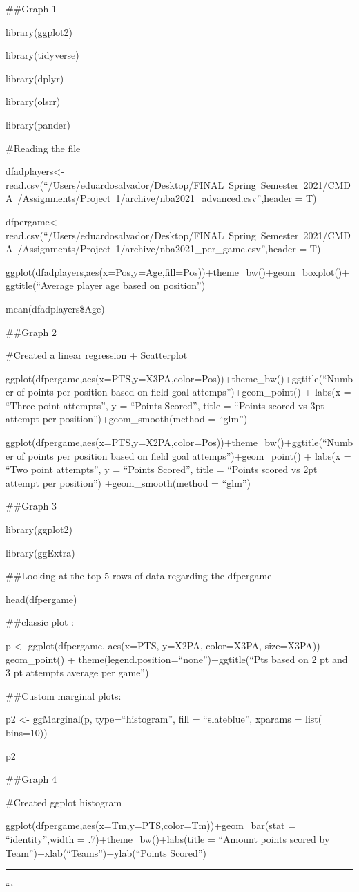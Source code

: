 \documentclass[
]{article}
\begin{document}
\#\#Graph 1

library(ggplot2)

library(tidyverse)

library(dplyr)

library(olsrr)

library(pander)

\#Reading the file

dfadplayers\textless-read.csv(``/Users/eduardosalvador/Desktop/FINAL~Spring~Semester~2021/CMDA~/Assignments/Project~1/archive/nba2021\_advanced.csv'',header
= T)

dfpergame\textless-read.csv(``/Users/eduardosalvador/Desktop/FINAL~Spring~Semester~2021/CMDA~/Assignments/Project~1/archive/nba2021\_per\_game.csv'',header
= T)

ggplot(dfadplayers,aes(x=Pos,y=Age,fill=Pos))+theme\_bw()+geom\_boxplot()+ggtitle(``Average
player age based on position'')

mean(dfadplayers\$Age)

\#\#Graph 2

\#Created a linear regression + Scatterplot

ggplot(dfpergame,aes(x=PTS,y=X3PA,color=Pos))+theme\_bw()+ggtitle(``Number
of points per position based on field goal attemps'')+geom\_point() +
labs(x = ``Three point attempts'', y = ``Points Scored'', title =
``Points scored vs 3pt attempt per position'')+geom\_smooth(method =
``glm'')

ggplot(dfpergame,aes(x=PTS,y=X2PA,color=Pos))+theme\_bw()+ggtitle(``Number
of points per position based on field goal attemps'')+geom\_point() +
labs(x = ``Two point attempts'', y = ``Points Scored'', title = ``Points
scored vs 2pt attempt per position'') +geom\_smooth(method = ``glm'')

\#\#Graph 3

library(ggplot2)

library(ggExtra)

\#\#Looking at the top 5 rows of data regarding the dfpergame

head(dfpergame)

\#\#classic plot :

p \textless- ggplot(dfpergame, aes(x=PTS, y=X2PA, color=X3PA,
size=X3PA)) + geom\_point() +
theme(legend.position=``none'')+ggtitle(``Pts based on 2 pt and 3 pt
attempts average per game'')

\#\#Custom marginal plots:

p2 \textless- ggMarginal(p, type=``histogram'', fill = ``slateblue'',
xparams = list( bins=10))

p2

\#\#Graph 4

\#Created ggplot histogram

ggplot(dfpergame,aes(x=Tm,y=PTS,color=Tm))+geom\_bar(stat =
``identity'',width = .7)+theme\_bw()+labs(title = ``Amount points scored
by Team'')+xlab(``Teams'')+ylab(``Points Scored'')

\vspace{.2in}
\hrule
\vspace{.2in}

\clearpage

\clearpage

```
\end{document}
